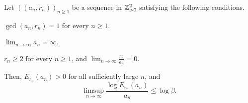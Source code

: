\begin{corollary}\label{cor:central-delete-limsup}
Let $((a_n,r_n))_{n\ge1}$ be a sequence in $\mathbb Z_{>0}^2$ satisfying the following conditions.
\begin{hypotheses}
\item\label{hyp:central-sequence-coprimality} $\gcd(a_n,r_n)=1$ for every $n\ge1$.
\item\label{hyp:central-sequence-size} $\displaystyle\lim_{n\to\infty}a_n=\infty$.
\item\label{hyp:central-sequence-ratio} $r_n\ge2$ for every $n\ge1$, and
$\displaystyle\lim_{n\to\infty}\frac{r_n}{a_n}=0$.
\end{hypotheses}
Then, $E_{r_n}(a_n)>0$ for all sufficiently large $n$, and
\[
 \limsup_{n\to\infty}\frac{\log E_{r_n}(a_n)}{a_n}\le\log\beta.
\]
\end{corollary}
